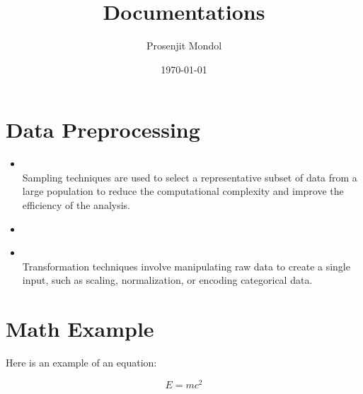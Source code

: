 \documentclass{article}
\title{Documentations}
\author{Prosenjit Mondol}
\date{\today}
\begin{document}
\maketitle

\newpage %

\section{Data Preprocessing}
\begin{itemize}
    \item \textbf{\textcolor{blue}{}}\\
        Sampling techniques are used to select a representative subset of data from a large population to reduce the computational complexity and improve the efficiency of the analysis.
    \item \item \textbf{\textcolor{blue}{}}\\
    Transformation techniques involve manipulating raw data to create a single input, such as scaling, normalization, or encoding categorical data.
\end{itemize}

\section{Math Example}

Here is an example of an equation:

\[
E = mc^2
\]
\end{document}
